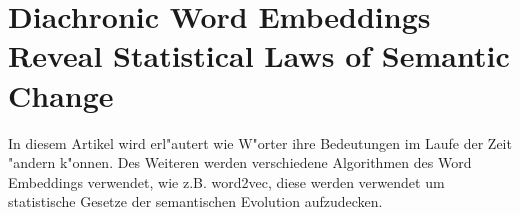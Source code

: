 \section{Diachronic Word Embeddings Reveal Statistical Laws of Semantic Change}
In diesem Artikel wird erl"autert wie W"orter ihre Bedeutungen im Laufe der Zeit "andern k"onnen. Des Weiteren werden verschiedene Algorithmen des Word Embeddings verwendet, wie z.B. word2vec, diese werden verwendet um statistische Gesetze der semantischen Evolution aufzudecken.
\cite{Hamilton2016}


  
